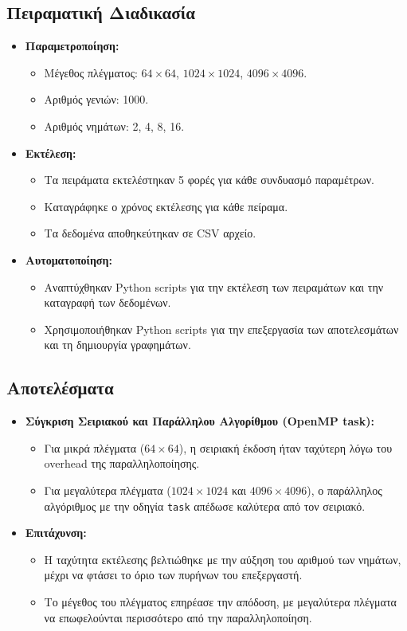 \documentclass{article}
\begin{document}
\subsection*{Πειραματική Διαδικασία} 
\begin{itemize} 
    \item \textbf{Παραμετροποίηση:} 
    \begin{itemize} 
        \item Μέγεθος πλέγματος: $64 \times 64$, $1024 \times 1024$, $4096 \times 4096$. 
        \item Αριθμός γενιών: 1000. 
        \item Αριθμός νημάτων: 2, 4, 8, 16. 
    \end{itemize} 
    \item \textbf{Εκτέλεση:} 
    \begin{itemize} 
        \item Τα πειράματα εκτελέστηκαν 5 φορές για κάθε συνδυασμό παραμέτρων. 
        \item Καταγράφηκε ο χρόνος εκτέλεσης για κάθε πείραμα. 
        \item Τα δεδομένα αποθηκεύτηκαν σε CSV αρχείο. 
    \end{itemize} 
    \item \textbf{Αυτοματοποίηση:} 
    \begin{itemize} 
        \item Αναπτύχθηκαν Python scripts για την εκτέλεση των πειραμάτων και την καταγραφή των δεδομένων. 
        \item Χρησιμοποιήθηκαν Python scripts για την επεξεργασία των αποτελεσμάτων και τη δημιουργία γραφημάτων. 
    \end{itemize} \end{itemize}
\subsection*{Αποτελέσματα} 
\begin{itemize} 
    \item \textbf{Σύγκριση Σειριακού και Παράλληλου Αλγορίθμου (OpenMP task):} 
    \begin{itemize} 
        \item Για μικρά πλέγματα ($64 \times 64$), η σειριακή έκδοση ήταν ταχύτερη λόγω του overhead της παραλληλοποίησης. 
        \item Για μεγαλύτερα πλέγματα ($1024 \times 1024$ και $4096 \times 4096$), ο παράλληλος αλγόριθμος με την οδηγία \texttt{task} απέδωσε καλύτερα από τον σειριακό. 
    \end{itemize} 
    \item \textbf{Επιτάχυνση:} 
    \begin{itemize} 
        \item Η ταχύτητα εκτέλεσης βελτιώθηκε με την αύξηση του αριθμού των νημάτων, μέχρι να φτάσει το όριο των πυρήνων του επεξεργαστή. 
        \item Το μέγεθος του πλέγματος επηρέασε την απόδοση, με μεγαλύτερα πλέγματα να επωφελούνται περισσότερο από την παραλληλοποίηση. 
    \end{itemize} 
\end{itemize}
\end{document}
